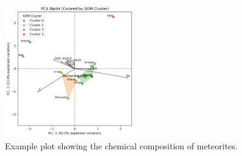 
\begin{figure}[htbp]
    \centering
    \includegraphics[width=0.5\textwidth]{figures/pca_biplot_som_convexhull.png}
    \caption{Example plot showing the chemical composition of meteorites.}
    \label{fig:pcabiplot_som_convexhull}
\end{figure}